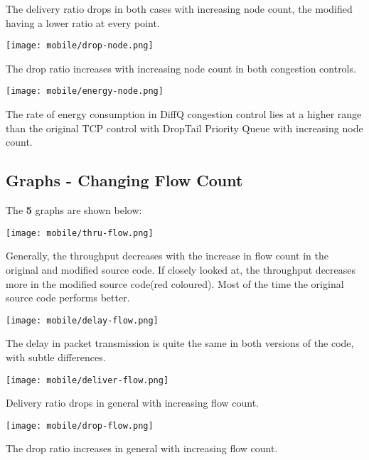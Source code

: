 \documentclass{article}
\begin{document}
The delivery ratio drops in both cases with increasing node count, the modified having a lower ratio at every point.

\begin{center}
    \texttt{[image: mobile/drop-node.png]}
\end{center}

The drop ratio increases with increasing node count in both congestion controls.

\begin{center}
    \texttt{[image: mobile/energy-node.png]}
\end{center}

The rate of energy consumption in DiffQ congestion control lies at a higher range than the original TCP control with DropTail Priority Queue with increasing node count.

\subsection{Graphs - Changing Flow Count}
The \textbf{5} graphs are shown below:

\begin{center}
    \texttt{[image: mobile/thru-flow.png]}
\end{center}

Generally, the throughput decreases with the increase in flow count in the original and modified source code. If closely looked at, the throughput decreases more in the modified source code(red coloured). Most of the time the original source code performs better.

\begin{center}
    \texttt{[image: mobile/delay-flow.png]}
\end{center}

The delay in packet transmission is quite the same in both versions of the code, with subtle differences.

\begin{center}
    \texttt{[image: mobile/deliver-flow.png]}
\end{center}

Delivery ratio drops in general with increasing flow count.

\begin{center}
    \texttt{[image: mobile/drop-flow.png]}
\end{center}

The drop ratio increases in general with increasing flow count.
\end{document}
